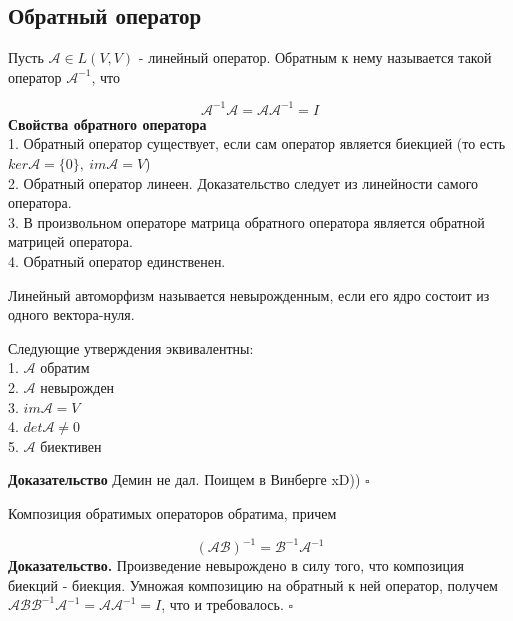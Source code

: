 \subsection{Обратный оператор}
\begin{defin}
Пусть $\mathcal A\in L(V,V)$ - линейный оператор. Обратным к нему называется
такой оператор $\mathcal A^{-1}$, что
\end{defin}
$$\mathcal A^{-1}\mathcal A=\mathcal A\mathcal A^{-1}=I$$
\textbf{Свойства обратного оператора}\\
1. Обратный оператор существует, если сам оператор является биекцией (то есть
$ker\mathcal A=\{0\},~im\mathcal A=V$)\\
2. Обратный оператор линеен. Доказательство следует из линейности самого 
оператора.\\
3. В произвольном операторе матрица обратного оператора является обратной 
матрицей оператора.\\
4. Обратный оператор единственен.
\begin{defin}
Линейный автоморфизм называется невырожденным, если его ядро состоит из 
одного вектора-нуля.
\end{defin}
\begin{theor}
Следующие утверждения эквивалентны:\\
1. $\mathcal A$ обратим\\
2. $\mathcal A$ невырожден\\
3. $im\mathcal A=V$\\
4. $det\mathcal A\ne0$\\
5. $\mathcal A$ биективен
\end{theor}
\textbf{Доказательство} Демин не дал. Поищем в Винберге xD)) $\square$
\begin{theor}
Композиция обратимых операторов обратима, причем
\end{theor}
$$(\mathcal A\mathcal B)^{-1}=\mathcal B^{-1}\mathcal A^{-1}$$
\textbf{Доказательство.} Произведение невырождено в силу того, что композиция
биекций - биекция. Умножая композицию на обратный к ней оператор, получем 
$\mathcal A\mathcal B\mathcal B^{-1}\mathcal A^{-1}=\mathcal A\mathcal 
A^{-1}=I$, что и требовалось. $\square$


